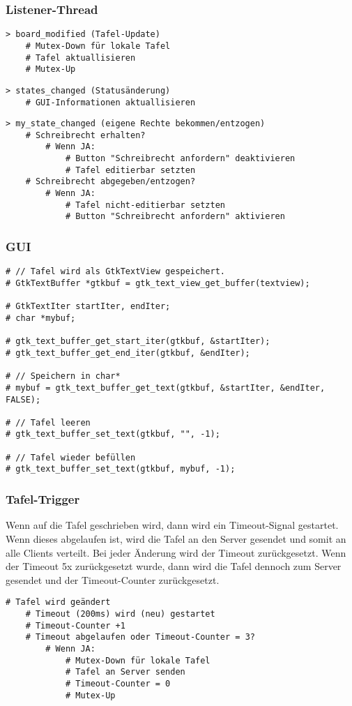 \subsubsection{Listener-Thread}
\begin{lstlisting}
> board_modified (Tafel-Update)
    # Mutex-Down für lokale Tafel
    # Tafel aktuallisieren
    # Mutex-Up
\end{lstlisting}
\begin{lstlisting}
> states_changed (Statusänderung)
    # GUI-Informationen aktuallisieren
\end{lstlisting}
\begin{lstlisting}
> my_state_changed (eigene Rechte bekommen/entzogen)
    # Schreibrecht erhalten?
        # Wenn JA:
            # Button "Schreibrecht anfordern" deaktivieren
            # Tafel editierbar setzten
    # Schreibrecht abgegeben/entzogen?
        # Wenn JA:
            # Tafel nicht-editierbar setzten
            # Button "Schreibrecht anfordern" aktivieren
\end{lstlisting}

\subsubsection{GUI}
\begin{lstlisting}
# // Tafel wird als GtkTextView gespeichert.
# GtkTextBuffer *gtkbuf = gtk_text_view_get_buffer(textview);

# GtkTextIter startIter, endIter;
# char *mybuf;

# gtk_text_buffer_get_start_iter(gtkbuf, &startIter);
# gtk_text_buffer_get_end_iter(gtkbuf, &endIter);

# // Speichern in char*
# mybuf = gtk_text_buffer_get_text(gtkbuf, &startIter, &endIter, FALSE);

# // Tafel leeren
# gtk_text_buffer_set_text(gtkbuf, "", -1);

# // Tafel wieder befüllen
# gtk_text_buffer_set_text(gtkbuf, mybuf, -1);
\end{lstlisting}

\subsubsection{Tafel-Trigger}
Wenn auf die Tafel geschrieben wird, dann wird ein Timeout-Signal gestartet. Wenn dieses abgelaufen ist, wird die Tafel an den Server gesendet und somit an alle Clients verteilt.
Bei jeder Änderung wird der Timeout zurückgesetzt. Wenn der Timeout 5x zurückgesetzt wurde, dann wird die Tafel dennoch zum Server gesendet und der Timeout-Counter zurückgesetzt.
\begin{lstlisting}
# Tafel wird geändert
    # Timeout (200ms) wird (neu) gestartet
    # Timeout-Counter +1
    # Timeout abgelaufen oder Timeout-Counter = 3?
        # Wenn JA:
            # Mutex-Down für lokale Tafel
            # Tafel an Server senden
            # Timeout-Counter = 0
            # Mutex-Up
\end{lstlisting}


